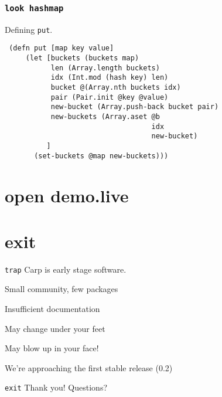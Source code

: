 \documentclass{beamer}
\begin{document}
  \begin{frame}[fragile]
    \frametitle{\texttt{look hashmap}}
    \begin{listing}[H]
      \caption{Defining \texttt{put}.}
      \begin{verbatim}
 (defn put [map key value]
     (let [buckets (buckets map)
           len (Array.length buckets)
           idx (Int.mod (hash key) len)
           bucket @(Array.nth buckets idx)
           pair (Pair.init @key @value)
           new-bucket (Array.push-back bucket pair)
           new-buckets (Array.aset @b
                                   idx
                                   new-bucket)
          ]
       (set-buckets @map new-buckets)))
      \end{verbatim}
    \end{listing}
  \end{frame}
  \section{open demo.live}
  \section{exit}
  \begin{frame}{\texttt{trap}}
    Carp is early stage software.
    \begin{arrowlist}
      \item Small community, few packages
      \item Insufficient documentation
      \item May change under your feet
      \item May blow up in your face!
    \end{arrowlist}
    We’re approaching the first stable release (0.2)
  \end{frame}
  \begin{frame}{\texttt{exit}}
    \Huge Thank you!
    \linebreak
    \linebreak
    \linebreak
    \small Questions?
  \end{frame}
\end{document}
